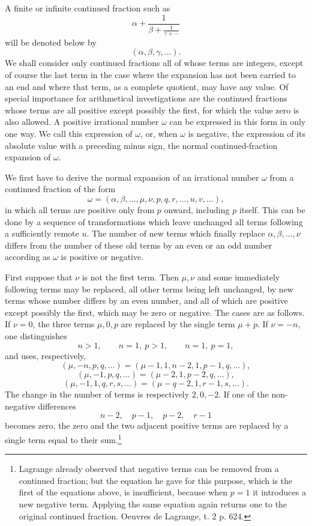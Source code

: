 \documentclass[11pt]{article}
\begin{document}
A finite or infinite continued fraction such as
\[
  \alpha+\frac{1}{\beta+\frac{1}{\gamma+\cdots}}
\]
will be denoted below by
\[
  (\alpha,\beta,\gamma,\ldots).
\]
We shall consider only continued fractions all of whose terms are integers, except of course the last term in the case where the expansion has not been carried to an end and where that term, as a complete quotient, may have any value. Of special importance for arithmetical investigations are the continued fractions whose terms are all positive except possibly the first, for which the value zero is also allowed. A positive irrational number $\omega$ can be expressed in this form in only one way. We call this expression of $\omega$, or, when $\omega$ is negative, the expression of its absolute value with a preceding minus sign, the normal continued-fraction expansion of $\omega$.

We first have to derive the normal expansion of an irrational number $\omega$ from a continued fraction of the form
\[
 \omega=(\alpha,\beta,\ldots,\mu,\nu,p,q,r,\ldots,u,v,\ldots),
\]
in which all terms are positive only from $p$ onward, including $p$ itself. This can be done by a sequence of transformations which leave unchanged all terms following a sufficiently remote $u$. The number of new terms which finally replace $\alpha,\beta,\ldots,\nu$ differs from the number of these old terms by an even or an odd number according as $\omega$ is positive or negative.

First suppose that $\nu$ is not the first term. Then $\mu,\nu$ and some immediately following terms may be replaced, all other terms being left unchanged, by new terms whose number differs by an even number, and all of which are positive except possibly the first, which may be zero or negative. The cases are as follows. If $\nu=0$, the three terms $\mu,0,p$ are replaced by the single term $\mu+p$. If $\nu=-n$, one distinguishes
\[
 n>1,
 \qquad n=1,
\ p>1,
 \qquad n=1,
\ p=1,
\]
and uses, respectively,
\[
 (\mu,-n,p,q,\ldots)=(\mu-1,1,n-2,1,p-1,q,\ldots),
\]
\[
 (\mu,-1,p,q,\ldots)=(\mu-2,1,p-2,q,\ldots),
\]
\[
 (\mu,-1,1,q,r,s,\ldots)=(\mu-q-2,1,r-1,s,\ldots).
\]
The change in the number of terms is respectively $2,0,-2$. If one of the non-negative differences
\[
 n-2,
\quad p-1,
\quad p-2,
\quad r-1
\]
becomes zero, the zero and the two adjacent positive terms are replaced by a single term equal to their sum.\footnote{Lagrange already observed that negative terms can be removed from a continued fraction; but the equation he gave for this purpose, which is the first of the equations above, is insufficient, because when $p=1$ it introduces a new negative term. Applying the same equation again returns one to the original continued fraction. Oeuvres de Lagrange, t. 2 p. 624.}
\end{document}

